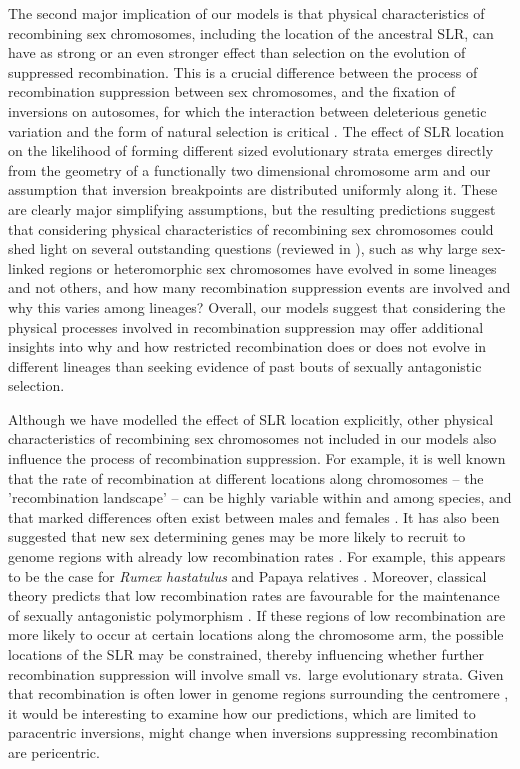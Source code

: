 \documentclass{article}[12pt]
\begin{document}
The second major implication of our models is that physical characteristics of recombining sex chromosomes, including the location of the ancestral SLR, can have as strong or an even stronger effect than selection on the evolution of suppressed recombination. This is a crucial difference between the process of recombination suppression between sex chromosomes, and the fixation of inversions on autosomes, for which the interaction between deleterious genetic variation and the form of natural selection is critical \citep{ConnallonOlito2020}. The effect of SLR location on the likelihood of forming different sized evolutionary strata emerges directly from the geometry of a functionally two dimensional chromosome arm and our assumption that inversion breakpoints are distributed uniformly along it. These are clearly major simplifying assumptions, but the resulting predictions suggest that considering physical characteristics of recombining sex chromosomes could shed light on several outstanding questions (reviewed in \citealt{Charlesworth2016, Charlesworth2017}), such as why large sex-linked regions or heteromorphic sex chromosomes have evolved in some lineages and not others, and how many recombination suppression events are involved and why this varies among lineages? Overall, our models suggest that considering the physical processes involved in recombination suppression may offer additional insights into why and how restricted recombination does or does not evolve in different lineages than seeking evidence of past bouts of sexually antagonistic selection.

Although we have modelled the effect of SLR location explicitly, other physical characteristics of recombining sex chromosomes not included in our models also influence the process of recombination suppression. For example, it is well known that the rate of recombination at different locations along chromosomes -- the 'recombination landscape' -- can be highly variable within and among species, and that marked differences often exist between males and females \citep[reviewed in ][]{SinghalEtAl2015,SardellKirkpatrick2020}. It has also been suggested that new sex determining genes may be more likely to recruit to genome regions with already low recombination rates \citep{Charlesworth1978a,vanDoornKirkpatrick2007, vanDoornKirkpatrick2010, OttoScottOsmond2018, Charlesworth2015, Olito2019}. For example, this appears to be the case for {\itshape Rumex hastatulus} and Papaya relatives \citep{RifkinBarrettWright2020,Lovene2015}. Moreover, classical theory predicts that low recombination rates are favourable for the maintenance of sexually antagonistic polymorphism \citep{Charlesworth1978a,Olito2017,Olito2019,Charlesworth2018}. If these regions of low recombination are more likely to occur at certain locations along the chromosome arm, the possible locations of the SLR may be constrained, thereby influencing whether further recombination suppression will involve small vs.~large evolutionary strata. Given that recombination is often lower in genome regions surrounding the centromere \citep[e.g.,][]{MahtaniWillard1998,SardellKirkpatrick2020}, it would be interesting to examine how our predictions, which are limited to paracentric inversions, might change when inversions suppressing recombination are pericentric.
\end{document}
